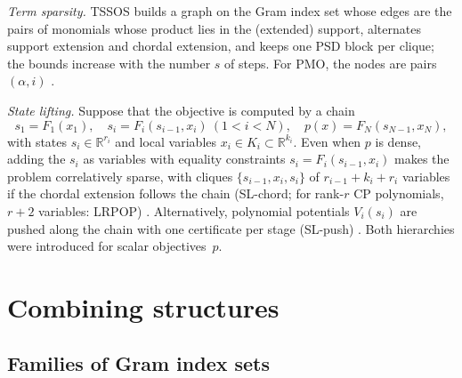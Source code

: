 \documentclass[smallextended]{svjour3}
\newcommand{\R}{\mathbb{R}}
\begin{document}
\emph{Term sparsity.} TSSOS \cite{TSSOS2021} builds a
graph on the Gram index set whose edges are the pairs of monomials whose
product lies in the (extended) support, alternates support extension and
chordal extension, and keeps one PSD block per clique; the bounds increase
with the number $s$ of steps. For PMO, the nodes are pairs $(\alpha,i)$
\cite{MillerWangGuo2026}.

\emph{State lifting.} Suppose that the objective is computed by a chain
\begin{equation}
\label{eq:chain}
s_1=F_1(x_1),\quad s_i=F_i(s_{i-1},x_i)\ (1<i<N),\quad
p(x)=F_N(s_{N-1},x_N),
\end{equation}
with states $s_i\in\R^{r_i}$ and local variables $x_i\in K_i\subset\R^{k_i}$.
Even when $p$ is dense, adding the $s_i$ as variables with equality
constraints $s_i=F_i(s_{i-1},x_i)$ makes the problem correlatively sparse,
with cliques $\{s_{i-1},x_i,s_i\}$ of $r_{i-1}+k_i+r_i$ variables if the
chordal extension follows the chain (SL-chord; for rank-$r$ CP polynomials,
$r+2$ variables: LRPOP) \cite{BGHK2025,BGHK2026}. Alternatively, polynomial
potentials $V_i(s_i)$ are pushed along the chain with one certificate per
stage (SL-push) \cite{BGHK2026}. Both hierarchies were introduced for scalar
objectives~$p$.

\section{Combining structures}
\label{sec:combine}

\subsection{Families of Gram index sets}
\end{document}
